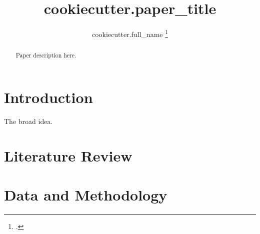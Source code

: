 \documentclass{article}
\title{ {{ cookiecutter.paper_title }} }
\author{ {{ cookiecutter.full_name }}\thanks{\italhref{mailto:{{ cookiecutter.email }} }{ {{ cookiecutter.email }} }.}}
\date{\monyear}
\begin{document}
\maketitle
\begin{abstract}
    Paper description here.
\end{abstract}

\doublespacing




\section{Introduction}


The broad idea.  



\section{Literature Review}





\section{Data and Methodology}





\end{document}
